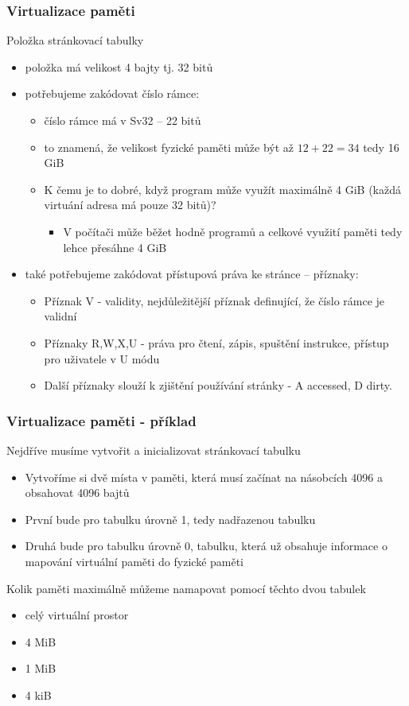\documentclass{beamer}
\begin{document}
\begin{frame}
\frametitle{Virtualizace paměti}

Položka stránkovací tabulky
\begin{itemize}
\item položka má velikost 4 bajty tj. 32 bitů
\item potřebujeme zakódovat číslo rámce:
\begin{itemize}
\item číslo rámce má v Sv32 -- 22 bitů
\item to znamená, že velikost fyzické paměti může být až $12 + 22 = 34$ tedy 16 GiB
\item K čemu je to dobré, když program může využít maximálně 4 GiB (každá virtuání adresa má pouze 32 bitů)?
\begin{itemize}
\item V počítači může běžet hodně programů a celkové využití paměti tedy lehce přesáhne 4 GiB
\end{itemize}
\end{itemize}
\item také potřebujeme zakódovat přístupová práva ke stránce -- příznaky:
\begin{itemize}
\item Příznak V - validity, nejdůležitější příznak definující, že číslo rámce je validní
\item Příznaky R,W,X,U - práva pro čtení, zápis, spuštění instrukce, přístup pro uživatele v U módu
\item Další příznaky slouží k zjištění používání stránky - A accessed, D dirty.
\end{itemize}
\end{itemize}
\end{frame}



\begin{frame}
\frametitle{Virtualizace paměti - příklad}

Nejdříve musíme vytvořit a inicializovat stránkovací tabulku
\begin{itemize}
\item Vytvoříme si dvě místa v paměti, která musí začínat na násobcích 4096 a obsahovat 4096 bajtů
\item První bude pro tabulku úrovně 1, tedy nadřazenou tabulku
\item Druhá bude pro tabulku úrovně 0, tabulku, která už obsahuje informace o mapování virtuální paměti do fyzické paměti
\end{itemize}

Kolik paměti maximálně můžeme namapovat pomocí těchto dvou tabulek
\begin{itemize}
 \item[A] celý virtuální prostor
 \item[B] 4 MiB
 \item[C] 1 MiB
 \item[D] 4 kiB
\end{itemize}
\end{frame}
\end{document}
